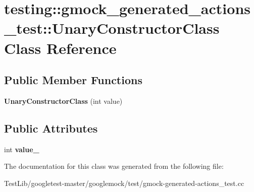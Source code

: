 \hypertarget{classtesting_1_1gmock__generated__actions__test_1_1UnaryConstructorClass}{}\section{testing\+:\+:gmock\+\_\+generated\+\_\+actions\+\_\+test\+:\+:Unary\+Constructor\+Class Class Reference}
\label{classtesting_1_1gmock__generated__actions__test_1_1UnaryConstructorClass}
\subsection*{Public Member Functions}
\begin{DoxyCompactItemize}
\item 
\mbox{\label{classtesting_1_1gmock__generated__actions__test_1_1UnaryConstructorClass_a35b2c0aab3928c1d558c11b6652a7262}} 
{\bfseries Unary\+Constructor\+Class} (int value)
\end{DoxyCompactItemize}
\subsection*{Public Attributes}
\begin{DoxyCompactItemize}
\item 
\mbox{\label{classtesting_1_1gmock__generated__actions__test_1_1UnaryConstructorClass_a5e96ce337c5eb7016eba2ea66ae46851}} 
int {\bfseries value\+\_\+}
\end{DoxyCompactItemize}


The documentation for this class was generated from the following file\+:\begin{DoxyCompactItemize}
\item 
Test\+Lib/googletest-\/master/googlemock/test/gmock-\/generated-\/actions\+\_\+test.\+cc\end{DoxyCompactItemize}
